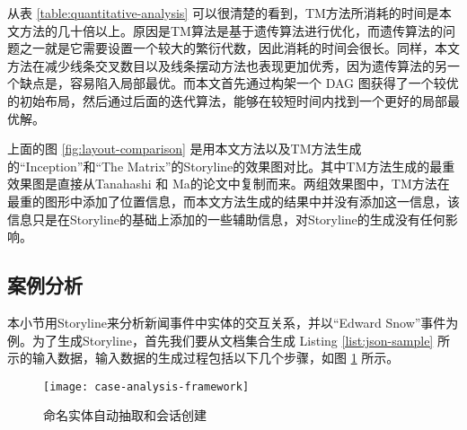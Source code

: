 从表 \ref{table:quantitative-analysis} 可以很清楚的看到，TM方法所消耗的时间是本文方法的几十倍以上。原因是TM算法是基于遗传算法进行优化，而遗传算法的问题之一就是它需要设置一个较大的繁衍代数，因此消耗的时间会很长。同样，本文方法在减少线条交叉数目以及线条摆动方法也表现更加优秀，因为遗传算法的另一个缺点是，容易陷入局部最优。而本文首先通过构架一个 DAG 图获得了一个较优的初始布局，然后通过后面的迭代算法，能够在较短时间内找到一个更好的局部最优解。

上面的图 \ref{fig:layout-comparison} 是用本文方法以及TM方法生成的“Inception”和“The Matrix”的Storyline的效果图对比。其中TM方法生成的最重效果图是直接从Tanahashi 和 Ma\cite{tanahashi2012design}的论文中复制而来。两组效果图中，TM方法在最重的图形中添加了位置信息，而本文方法生成的结果中并没有添加这一信息，该信息只是在Storyline的基础上添加的一些辅助信息，对Storyline的生成没有任何影响。

\subsection{案例分析}
本小节用Storyline来分析新闻事件中实体的交互关系，并以“Edward Snow”事件为例。为了生成Storyline，首先我们要从文档集合生成 Listing \ref{list:json-sample} 所示的输入数据，输入数据的生成过程包括以下几个步骤，如图 \ref{fig:case-analysis-framework} 所示。

\begin{figure}[htb]
    \centering
        \texttt{[image: case-analysis-framework]}
    \caption{命名实体自动抽取和会话创建}
    \label{fig:case-analysis-framework}
\end{figure}

